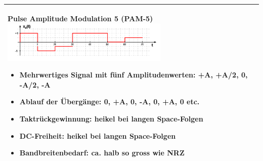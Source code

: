 \begin{longtable}{|p{9cm}|p{9cm}|}
	\textbf{Pulse Amplitude Modulation 5 (PAM-5)}\newline
	\includegraphics[width=8cm]{bilder/DigitaleBasisbandSignale/PulseAmplitudeModulation5.png}\newline
	\begin{itemize}[noitemsep]
		\item Mehrwertiges Signal mit fünf Amplitudenwerten: +A, +A/2, 0, -A/2, -A
		\item \textbf{Ablauf der Übergänge:} 0, +A, 0, -A, 0, +A, 0 etc.
		\item \textbf{Taktrückgewinnung:} heikel bei langen Space-Folgen
		\item \textbf{DC-Freiheit:} heikel bei langen Space-Folgen
		\item \textbf{Bandbreitenbedarf:} ca. halb so gross wie NRZ
	\end{itemize}
	&\\
	\hline
\end{longtable}






